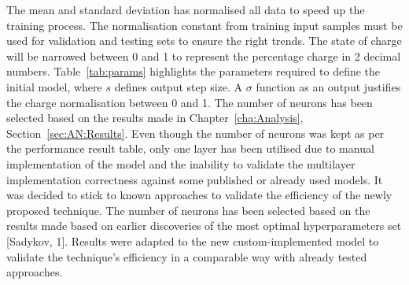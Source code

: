%
%
The mean and standard deviation has normalised all data to speed up the training process.
The normalisation constant from training input samples must be used for validation and testing sets to ensure the right trends.
The state of charge will be narrowed between 0 and 1 to represent the percentage charge in 2 decimal numbers.
\mbox{Table~\ref{tab:params}} highlights the parameters required to define the initial model, where $s$ defines output step size.
A $\sigma$ function as an output justifies the charge normalisation between 0 and 1.
{
    The number of neurons has been selected based on the results made in Chapter~\ref{cha:Analysis}, Section~\ref{sec:AN:Results}.
    Even though the number of neurons was kept as per the performance result table, only one layer has been utilised due to manual implementation of the model and the inability to validate the multilayer implementation correctness against some published or already used models.
    It was decided to stick to known approaches to validate the efficiency of the newly proposed technique.
} {
    The number of neurons has been selected based on the results made based on earlier discoveries of the most optimal hyperparameters set [Sadykov, 1].
    Results were adapted to the new custom-implemented model to validate the technique's efficiency in a comparable way with already tested approaches.
}
\begin{table}[ht]
    \renewcommand{\arraystretch}{1.3}
    \caption{Model structure and parameters}
    \centering
    \label{tab:params}
\end{table}


